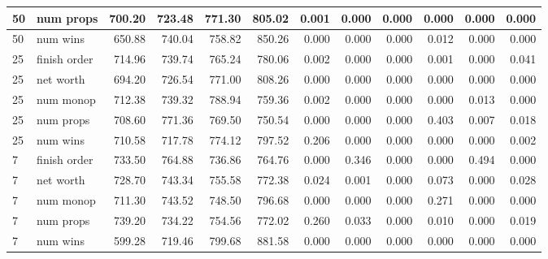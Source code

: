 \begin{landscape}
\begin{table}[ht]
\begin{tabularx}{\linewidth}{|p{1in}|p{1in}|r|r|r|r|r|r|r|r|r|r|}
    50     & num props & 700.20 & 723.48 & 771.30 & 805.02 & 0.001  & 0.000  & 0.000  & 0.000  & 0.000  & 0.000 \\ \hline
    50     & num wins & 650.88 & 740.04 & 758.82 & 850.26 & 0.000  & 0.000  & 0.000  & 0.012  & 0.000  & 0.000 \\ \hline
    25     & finish order & 714.96 & 739.74 & 765.24 & 780.06 & 0.002  & 0.000  & 0.000  & 0.001  & 0.000  & 0.041 \\ \hline
    25     & net worth & 694.20 & 726.54 & 771.00 & 808.26 & 0.000  & 0.000  & 0.000  & 0.000  & 0.000  & 0.000 \\ \hline
    25     & num monop & 712.38 & 739.32 & 788.94 & 759.36 & 0.002  & 0.000  & 0.000  & 0.000  & 0.013  & 0.000 \\ \hline
    25     & num props & 708.60 & 771.36 & 769.50 & 750.54 & 0.000  & 0.000  & 0.000  & 0.403  & 0.007  & 0.018 \\ \hline
    25     & num wins & 710.58 & 717.78 & 774.12 & 797.52 & 0.206  & 0.000  & 0.000  & 0.000  & 0.000  & 0.002 \\ \hline
    7      & finish order & 733.50 & 764.88 & 736.86 & 764.76 & 0.000  & 0.346  & 0.000  & 0.000  & 0.494  & 0.000 \\ \hline
    7      & net worth & 728.70 & 743.34 & 755.58 & 772.38 & 0.024  & 0.001  & 0.000  & 0.073  & 0.000  & 0.028 \\ \hline
    7      & num monop & 711.30 & 743.52 & 748.50 & 796.68 & 0.000  & 0.000  & 0.000  & 0.271  & 0.000  & 0.000 \\ \hline
    7      & num props & 739.20 & 734.22 & 754.56 & 772.02 & 0.260  & 0.033  & 0.000  & 0.010  & 0.000  & 0.019 \\ \hline
    7      & num wins & 599.28 & 719.46 & 799.68 & 881.58 & 0.000  & 0.000  & 0.000  & 0.000  & 0.000  & 0.000 \\ \hline
    \end{tabularx}%
  \label{tab:addlabel}%
\end{table}%

\end{landscape}